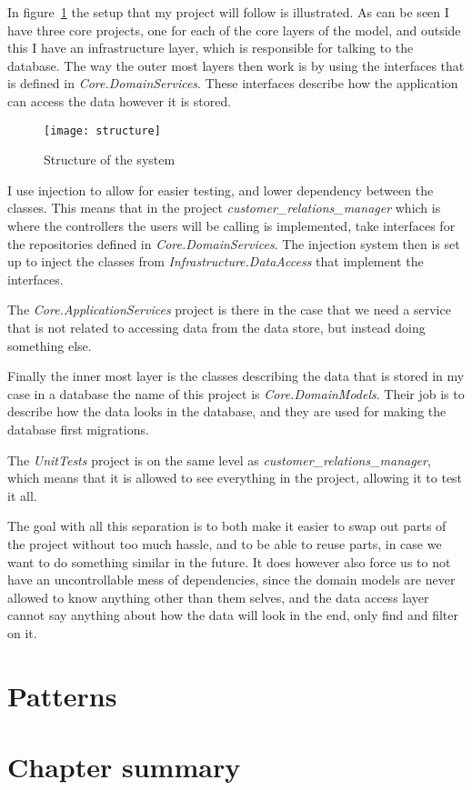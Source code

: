 In figure~\ref{fig:structure} the setup that my project will follow is illustrated. As can be seen I have three core projects, one for each of the core layers of the model, and outside this I have an infrastructure layer, which is responsible for talking to the database. The way the outer most layers then work is by using the interfaces that is defined in \textit{Core.DomainServices}. These interfaces describe how the application can access the data however it is stored.

\begin{figure}[h]
  \centering
  \texttt{[image: structure]}
  \caption{Structure of the system}
  \label{fig:structure}
\end{figure}

I use injection to allow for easier testing, and lower dependency between the classes. This means that in the project \textit{customer\_relations\_manager} which is where the controllers the users will be calling is implemented, take interfaces for the repositories defined in \textit{Core.DomainServices}. The injection system then is set up to inject the classes from \textit{Infrastructure.DataAccess} that implement the interfaces.

The \textit{Core.ApplicationServices} project is there in the case that we need a service that is not related to accessing data from the data store, but instead doing something else.

Finally the inner most layer is the classes describing the data that is stored in my case in a database the name of this project is \textit{Core.DomainModels}. Their job is to describe how the data looks in the database, and they are used for making the database first migrations.

The \textit{UnitTests} project is on the same level as \textit{customer\_relations\_manager}, which means that it is allowed to see everything in the project, allowing it to test it all.

The goal with all this separation is to both make it easier to swap out parts of the project without too much hassle, and to be able to reuse parts, in case we want to do something similar in the future. It does however also force us to not have an uncontrollable mess of dependencies, since the domain models are never allowed to know anything other than them selves, and the data access layer cannot say anything about how the data will look in the end, only find and filter on it.

\section{Patterns}
\label{sec:Patterns}

\section{Chapter summary}
